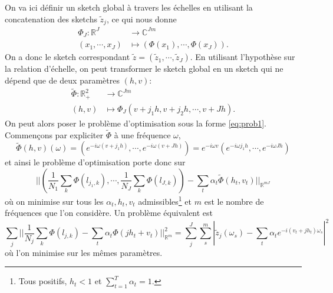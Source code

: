 \documentclass[11pt]{article} %
\begin{document}
On va ici définir un sketch global à travers les échelles en utilisant la concatenation des sketchs $\tilde z_j$, ce qui nous donne 
\begin{align}
	\Phi_J : \mathbb{R}^J &\to \mathbb{C}^{Jm}\\
			(x_1,\cdots,x_J)&\mapsto (\Phi(x_1),\cdots, \Phi(x_J)).
\end{align}
On a donc le sketch correspondant $\tilde z = (\tilde z_1,\cdots, \tilde z_J)$. En utilisant l'hypothèse sur la relation d'échelle, on peut transformer le sketch global en un sketch qui ne dépend que de deux paramètres $(h,v)$:
\begin{align}
	\tilde \Phi :\mathbb{R}_+^2 &\to \mathbb{C}^{Jm}\\
			(h,v)&\mapsto \Phi_J(v + j_1h, v+j_2h,\cdots, v+Jh).
\end{align} 
On peut alors poser le problème d'optimisation sous la forme \ref{eq:prob1}. Commençons par expliciter $\tilde \Phi$ à une fréquence $\omega$, 
\begin{equation}
\tilde\Phi(h,v)(\omega) = (e^{-i\omega (v+j_1h)},\cdots, e^{-i\omega (v+Jh)}) = e^{-i\omega v}(e^{-i\omega j_1 h},\cdots, e^{-i\omega Jh})
\end{equation}
et ainsi le problème d'optimisation porte donc sur
\begin{equation}
	||(\frac{1}{N_1}\sum_{k} \Phi(l_{j_1, k}),\cdots, \frac{1}{N_J} \sum_k \Phi(l_{J,k})) - \sum_t \alpha_t \tilde\Phi(h_t,v_t) ||_{\mathbb{R}^{mJ}}
\end{equation}
où on minimise sur tous les $\alpha_t,h_t,v_t$ admissibles\footnote{Tous positifs, $h_t<1$ et $\sum_{t=1}^T \alpha_t = 1$.} et $m$ est le nombre de fréquences que l'on considère. Un problème équivalent est 
\begin{equation}
	\sum_{j} ||\frac{1}{N_j}\sum_{k} \Phi(l_{j, k}) - \sum_t \alpha_t \Phi( jh_t + v_t) ||_{\mathbb{R}^{m}}^2 = \sum_{j}^J \sum_{s}^m |\tilde z_{j}(\omega_s) - \sum_t \alpha_t e^{-i(v_t +jh_t)\omega_s}|^2
\end{equation}
où l'on minimise sur les mêmes paramètres.
\end{document}

